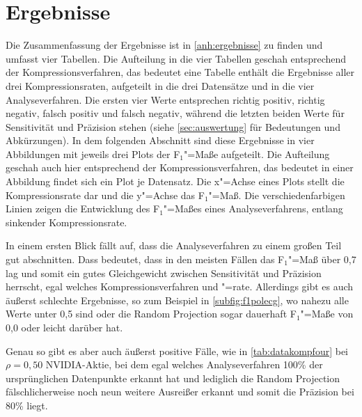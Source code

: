 \section{Ergebnisse}
Die Zusammenfassung der Ergebnisse ist in \autoref{anh:ergebnisse} zu finden und umfasst vier Tabellen. Die Aufteilung in die vier Tabellen geschah entsprechend der Kompressionsverfahren, das bedeutet eine Tabelle enthält die Ergebnisse aller drei Kompressionsraten, aufgeteilt in die drei Datensätze und in die vier Analyseverfahren. Die ersten vier Werte entsprechen richtig positiv, richtig negativ, falsch positiv und falsch negativ, während die letzten beiden Werte für Sensitivität und Präzision stehen (siehe \autoref{sec:auswertung} für Bedeutungen und Abkürzungen). In dem folgenden Abschnitt sind diese Ergebnisse in vier Abbildungen mit jeweils drei Plots der F$_1$"=Maße aufgeteilt. Die Aufteilung geschah auch hier entsprechend der Kompressionsverfahren, das bedeutet in einer Abbildung findet sich ein Plot je Datensatz. Die x"=Achse eines Plots stellt die Kompressionsrate dar und die y"=Achse das F$_1$"=Maß. Die verschiedenfarbigen Linien zeigen die Entwicklung des F$_1$"=Maßes eines Analyseverfahrens, entlang sinkender Kompressionsrate.


In einem ersten Blick fällt auf, dass die Analyseverfahren zu einem großen Teil gut abschnitten. Dass bedeutet, dass in den meisten Fällen das F$_1$"=Maß über 0,7 lag und somit ein gutes Gleichgewicht zwischen Sensitivität und Präzision herrscht, egal welches Kompressionsverfahren und "=rate. Allerdings gibt es auch äußerst schlechte Ergebnisse, so zum Beispiel in \autoref{subfig:f1polecg}, wo nahezu alle Werte unter 0,5 sind oder die Random Projection sogar dauerhaft F$_1$"=Maße von 0,0 oder leicht darüber hat.

Genau so gibt es aber auch äußerst positive Fälle, wie in \autoref{tab:datakompfour} bei $\rho=0,50$ NVIDIA-Aktie, bei dem egal welches Analyseverfahren 100\% der ursprünglichen Datenpunkte erkannt hat und lediglich die Random Projection fälschlicherweise noch neun weitere Ausreißer erkannt und somit die Präzision bei 80\% liegt.

